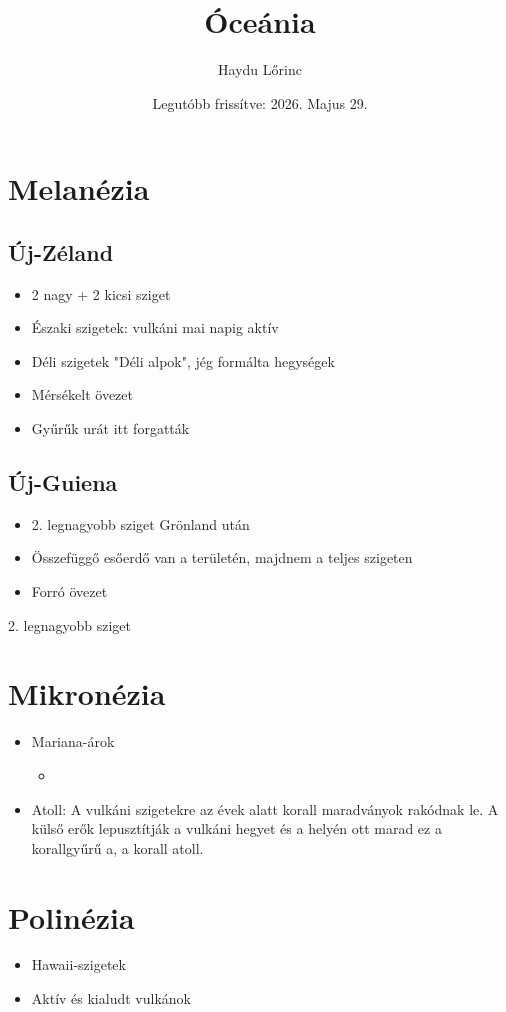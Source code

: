\documentclass{article}
\title{Óceánia}
\author{Haydu Lőrinc}
\date{Legutóbb frissítve: 2026. Majus 29.}
\begin{document}
\maketitle
\tableofcontents
\newpage

\section{Melanézia}
\subsection{Új-Zéland}
\begin{itemize}
    \item 2 nagy + 2 kicsi sziget
    \item Északi szigetek: vulkáni mai napig aktív
    \item Déli szigetek "Déli alpok", jég formálta hegységek
    \item Mérsékelt övezet
    \item Gyűrűk urát itt forgatták
\end{itemize}
\subsection{Új-Guiena}
\begin{itemize}
    \item 2. legnagyobb sziget Grönland után
    \item Összefüggő esőerdő van a területén, majdnem a teljes szigeten
    \item Forró övezet
\end{itemize}
    2. legnagyobb sziget
\section{Mikronézia}
    \begin{itemize}
        \item Mariana-árok \begin{itemize}
            \item 
        \end{itemize}
    \end{itemize}
\begin{itemize}
    \item Atoll: A vulkáni szigetekre az évek alatt korall maradványok rakódnak le. A külső erők lepusztítják a vulkáni hegyet és a helyén ott marad ez a korallgyűrű a, a korall atoll.
\end{itemize}
\section{Polinézia}
\begin{itemize}
    \item Hawaii-szigetek
    \item Aktív és kialudt vulkánok
\end{itemize}
\end{document}

